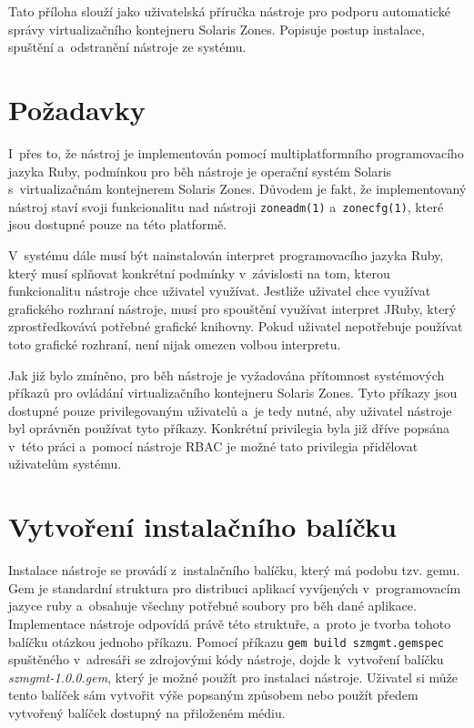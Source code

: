 \label{appendix:installation}
Tato příloha slouží jako uživatelská příručka nástroje pro podporu automatické správy virtualizačního kontejneru Solaris Zones.
Popisuje postup instalace, spuštění a~odstranění nástroje ze systému.
\section{Požadavky}
\label{appendix:installation:demands}
I~přes to, že nástroj je implementován pomocí multiplatformního programovacího jazyka Ruby, podmínkou pro běh nástroje je operační
systém Solaris s~virtualizačnám kontejnerem Solaris Zones. Důvodem je fakt, že implementovaný nástroj staví svoji funkcionalitu
nad nástroji \texttt{zoneadm(1)} a~\texttt{zonecfg(1)}, které jsou dostupné pouze na této platformě.

V~systému dále musí být nainstalován interpret programovacího jazyka Ruby, který musí splňovat konkrétní podmínky v~závislosti na tom,
kterou funkcionalitu nástroje chce uživatel využívat. Jestliže uživatel chce využívat grafického rozhraní nástroje, musí pro
spouštění využívat interpret JRuby, který zprostředkovává potřebné grafické knihovny. Pokud uživatel nepotřebuje používat
toto grafické rozhraní, není nijak omezen volbou interpretu.

Jak již bylo zmíněno, pro běh nástroje je vyžadována přítomnost systémových příkazů pro ovládání virtualizačního kontejneru Solaris
Zones. Tyto příkazy jsou dostupné pouze privilegovaným uživatelů a~je tedy nutné, aby uživatel nástroje byl oprávněn používat 
tyto příkazy. Konkrétní privilegia byla již dříve popsána v~této práci a~pomocí nástroje RBAC je možné tato privilegia přidělovat
uživatelům systému.
\section{Vytvoření instalačního balíčku}
\label{appendix:installation:package}
Instalace nástroje se provádí z~instalačního balíčku, který má podobu tzv. gemu. Gem je standardní struktura pro distribuci aplikací
vyvíjených v~programovacím jazyce ruby a~obsahuje všechny potřebné soubory pro běh dané aplikace. Implementace nástroje odpovídá
právě této struktuře, a~proto je tvorba tohoto balíčku otázkou jednoho příkazu. Pomocí příkazu \texttt{gem build szmgmt.gemspec}
spuštěného v~adresáři se zdrojovými kódy nástroje, dojde k~vytvoření balíčku \textit{szmgmt-1.0.0.gem}, který je možné použít
pro instalaci nástroje. Uživatel si může tento balíček sám vytvořit výše popsaným způsobem nebo použít předem vytvořený balíček 
dostupný na přiloženém médiu.
